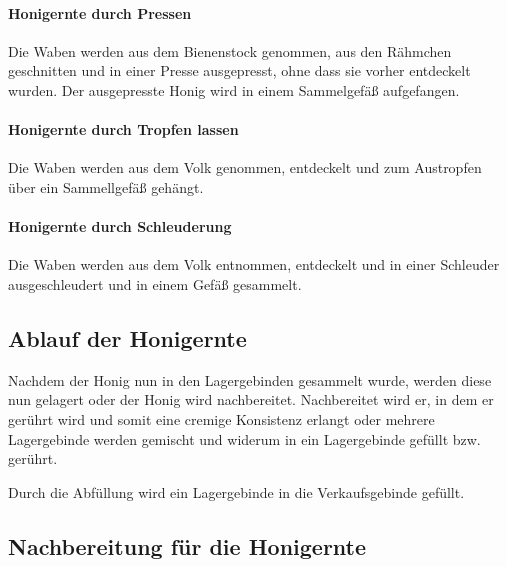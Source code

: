 \paragraph{Honigernte durch Pressen}
Die Waben werden aus dem Bienenstock genommen, aus den Rähmchen geschnitten und
in einer Presse ausgepresst, ohne dass sie vorher entdeckelt wurden. Der
ausgepresste Honig wird in einem Sammelgefäß aufgefangen.
\paragraph{Honigernte durch Tropfen lassen}
Die Waben werden aus dem Volk genommen, entdeckelt und zum Austropfen über ein
Sammellgefäß gehängt.
\paragraph{Honigernte durch Schleuderung}
Die Waben werden aus dem Volk entnommen, entdeckelt und in einer Schleuder
ausgeschleudert und in einem Gefäß gesammelt.


\subsection{Ablauf der Honigernte}

Nachdem der Honig nun in den Lagergebinden gesammelt wurde,
werden diese nun gelagert oder der Honig wird nachbereitet.
Nachbereitet wird er, in dem er gerührt wird und somit eine cremige Konsistenz
erlangt oder mehrere Lagergebinde werden gemischt und widerum in ein
Lagergebinde gefüllt bzw. gerührt.

Durch die Abfüllung wird ein Lagergebinde in die Verkaufsgebinde
gefüllt.
\bigskip


\subsection{Nachbereitung für die Honigernte}
 
